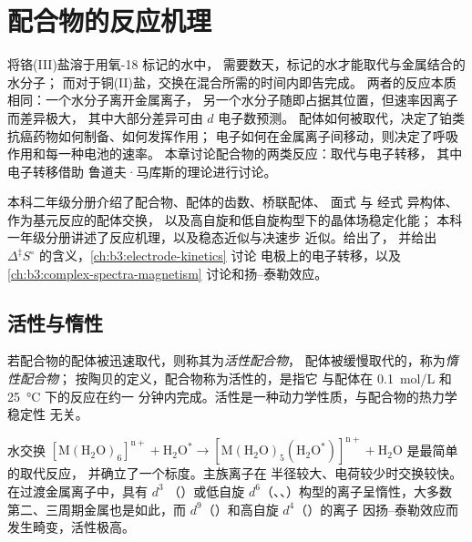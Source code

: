 \chapter{配合物的反应机理}\label{ch:b3:complex-mechanisms}

将铬(III)盐溶于用氧-18 标记的水中，
需要数天，标记的水才能取代与金属结合的水分子；
而对于铜(II)盐，交换在混合所需的时间内即告完成。
两者的反应本质相同：一个水分子离开金属离子，
另一个水分子随即占据其位置，但速率因离子而差异极大，
其中大部分差异可由 $d$ 电子数预测。
配体如何被取代，决定了铂类抗癌药物如何制备、如何发挥作用；
电子如何在金属离子间移动，则决定了呼吸作用和每一种电池的速率。
本章讨论配合物的两类反应：取代与电子转移，
其中电子转移借助
鲁道夫·马库斯的理论进行讨论。

\begin{recall}
本科二年级分册介绍了配合物、配体的齿数、桥联配体、
面式 与 经式 异构体、作为基元反应的配体交换，
以及高自旋和低自旋构型下的晶体场稳定化能；
本科一年级分册讲述了反应机理，以及稳态近似与决速步
近似。给出了，
并给出 $\Delta^{\ddagger}S^\circ$ 的含义，\cref{ch:b3:electrode-kinetics} 讨论
电极上的电子转移，以及\cref{ch:b3:complex-spectra-magnetism}
讨论和扬–泰勒效应。
\end{recall}

\section{活性与惰性}

\begin{definition}[活性配合物与惰性配合物]\label{def:b3:complex-mechanisms:labile}
若配合物的配体被迅速取代，则称其为\emph{活性配合物}，
配体被缓慢取代的，称为\emph{惰性配合物}；
按陶贝的定义，配合物称为活性的，是指它
与配体在 \qty{0.1}{mol/L} 和 \qty{25}{\celsius} 下的反应在约一
分钟内完成。活性是一种动力学性质，与配合物的热力学稳定性
无关。
\end{definition}

水交换 $\mathrm{[M(H_2O)_6]^{n+} + H_2O^{\ast} \to [M(H_2O)_5(H_2O^{\ast})]^{n+} + H_2O}$ 是最简单的取代反应，
并确立了一个标度。主族离子在
半径较大、电荷较少时交换较快。在过渡金属离子中，具有 $d^3$
（）或低自旋 $d^6$（、、）构型的离子呈惰性，大多数
第二、三周期金属也是如此，而 $d^9$（）和高自旋 $d^4$（）的离子
因扬–泰勒效应而发生畸变，活性极高。

